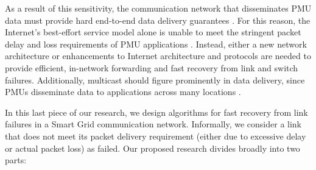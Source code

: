 As a result of this sensitivity, the communication network that disseminates PMU data must provide hard end-to-end data delivery guarantees \cite{Bakken11}. 
For this reason, the Internet's best-effort service model alone is unable to meet the stringent packet delay and loss requirements of PMU applications \cite{Birman05}. 
Instead, either a new network architecture or enhancements to Internet architecture and protocols are needed \cite{Bakken11,Birman05,Naspi10,Hopkinson09} to provide efficient, in-network forwarding and fast recovery from link and switch failures. 
Additionally, multicast should figure prominently in data  delivery, since PMUs disseminate  data  to applications across many locations \cite{Bakken11}.

In this last piece of our research, we design algorithms for fast recovery from link failures in a Smart Grid communication network. 
Informally, we consider a link that does not meet its packet delivery requirement (either due to excessive delay or actual packet loss) as failed.  Our proposed research divides broadly into two parts:
